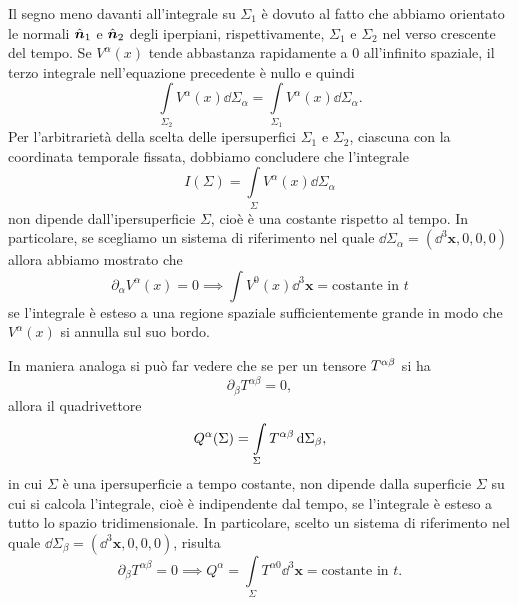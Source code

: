 Il segno meno davanti all'integrale su $\Sigma_{1}$ è dovuto al fatto che
abbiamo orientato le normali $\hat{\bm{n}}_{1}$ e $\hat{\bm{n}}_{2}$ degli
iperpiani, rispettivamente, $\Sigma_{1}$ e $\Sigma_{2}$ nel verso crescente del
tempo.  Se $V^{\alpha}(x)$ tende abbastanza rapidamente a $0$ all'infinito
spaziale, il terzo integrale nell'equazione precedente è nullo e quindi
\begin{equation}
  \int\limits_{\Sigma_{2}} V^{\alpha}(x) \dd\Sigma_{\alpha} =
  \int\limits_{\Sigma_{1}} V^{\alpha}(x) \dd\Sigma_{\alpha}.
\end{equation}
Per l'arbitrarietà della scelta delle ipersuperfici $\Sigma_{1}$ e $\Sigma_{2}$,
ciascuna con la coordinata temporale fissata, dobbiamo concludere che
l'integrale
\begin{equation}
  I(\Sigma) = \int\limits_{\Sigma} V^{\alpha}(x) \dd\Sigma_{\alpha}
\end{equation}
non dipende dall'ipersuperficie $\Sigma$, cioè è una costante rispetto al tempo.
In particolare, se scegliamo un sistema di riferimento nel quale
$\dd\Sigma_{\alpha} = (\dd^{3} \bm{x}, 0, 0, 0)$ allora abbiamo mostrato che
\begin{equation}
  \partial_{\alpha}V^{\alpha}(x) = 0 \implies \int V^{0}(x) \dd^{3} \bm{x} =
  \text{costante in $t$}
\end{equation}
se l'integrale è esteso a una regione spaziale sufficientemente grande in modo
che $V^{\alpha}(x)$ si annulla sul suo bordo.

In maniera analoga si può far vedere che se per un tensore
$\tensor{T}{^{\alpha\beta}}$ si ha
\begin{equation}
  \partial_{\beta}T^{\alpha\beta} = 0,
\end{equation}
allora il quadrivettore
\begin{equation}
  Q^{\alpha}(\Sigma) = \int\limits_{\Sigma} \tensor{T}{^{\alpha\beta}}\dd
  \Sigma_{\beta},
\end{equation}
in cui $\Sigma$ è una ipersuperficie a tempo costante, non dipende dalla
superficie $\Sigma$ su cui si calcola l'integrale, cioè è indipendente dal
tempo, se l'integrale è esteso a tutto lo spazio tridimensionale.  In
particolare, scelto un sistema di riferimento nel quale
$\dd\Sigma_{\beta} = (\dd^{3} \bm{x}, 0, 0, 0)$, risulta
\begin{equation}
  \partial_{\beta}T^{\alpha\beta} = 0 \implies Q^{\alpha} = \int\limits_{\Sigma}
  T^{\alpha0} \dd^{3} \bm{x} = \text{costante in $t$}.
\end{equation}

